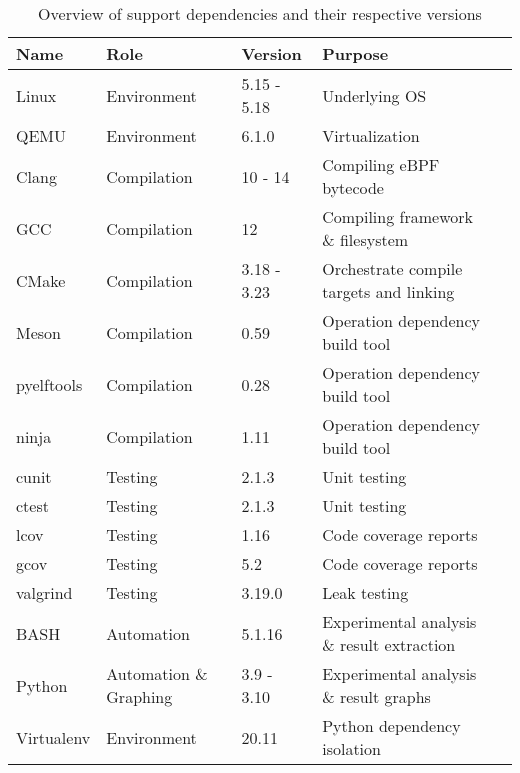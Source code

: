 \begin{table}
    \caption{Overview of support dependencies and their respective versions}
    \centering
    \begin{adjustbox}{width=1\textwidth}
        \begin{threeparttable}[]
            \begin{tabular}{lllll}
                \toprule
                \textbf{Name} & \textbf{Role} & \textbf{Version} & \textbf{Purpose} \\
                \midrule
                Linux & Environment & 5.15 - 5.18 & Underlying OS \\
                QEMU & Environment & 6.1.0 & Virtualization \\
                Clang & Compilation & 10 - 14 & Compiling eBPF bytecode \\
                GCC & Compilation & 12 & Compiling framework \& filesystem \\
                CMake & Compilation & 3.18 - 3.23 & Orchestrate compile targets and linking \\
                Meson & Compilation & 0.59 & Operation dependency build tool \\
                pyelftools & Compilation & 0.28 & Operation dependency build tool \\
                ninja & Compilation & 1.11 & Operation dependency build tool \\
                cunit & Testing & 2.1.3 & Unit testing \\
                ctest & Testing & 2.1.3 & Unit testing \\
                lcov & Testing & 1.16 & Code coverage reports \\
                gcov & Testing & 5.2 & Code coverage reports \\
                valgrind & Testing & 3.19.0 & Leak testing \\
                BASH & Automation & 5.1.16 & Experimental analysis \& result extraction \\
                Python & Automation \& Graphing & 3.9 - 3.10 & Experimental analysis \& result graphs \\
                Virtualenv & Environment & 20.11 & Python dependency isolation \\
                \bottomrule
            \end{tabular}
        \end{threeparttable}
        \label{table:supportdependencies}
    \end{adjustbox}
\end{table}


